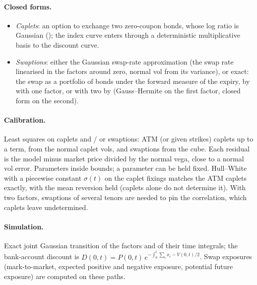 \paragraph{Closed forms.}
\begin{itemize}[nosep]
  \item \emph{Caplets}: an option to exchange two zero-coupon bonds, whose log ratio is Gaussian (\citealp{margrabe1978});
        the index curve enters through a deterministic multiplicative basis to the discount curve.
  \item \emph{Swaptions}: either the Gaussian swap-rate approximation (the swap rate linearised in the factors around
        zero, normal vol from its variance), or exact: the swap as a portfolio of bonds under the forward measure of the
        expiry, by \citet{jamshidian1989} with one factor, or with two by \citet{brigo2006} (Gauss--Hermite on the first
        factor, closed form on the second).
\end{itemize}

\paragraph{Calibration.} Least squares on caplets and / or swaptions: ATM (or given strikes) caplets up to a term, from
the normal caplet vols, and swaptions from the cube. Each residual is the model minus market price divided by the
normal vega, close to a normal vol error. Parameters inside bounds; a parameter can be held fixed. Hull--White with a
piecewise constant $\sigma(t)$ on the caplet fixings matches the ATM caplets exactly, with the mean reversion held (caplets
alone do not determine it). With two factors, swaptions of several tenors are needed to pin the correlation, which
caplets leave undetermined.

\paragraph{Simulation.} Exact joint Gaussian transition of the factors and of their time integrals; the bank-account
discount is $D(0,t) = P(0,t)\,e^{-\int_0^t \sum_i x_i - V(0,t)/2}$. Swap exposures (mark-to-market, expected positive and negative
exposure, potential future exposure) are computed on these paths.
